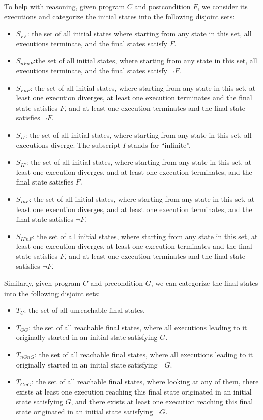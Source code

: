 To help with reasoning, given program $C$ and postcondition $F$, we consider its executions and categorize the initial states into the following disjoint sets: 
\begin{itemize}
	\item $S_{FF}$: the set of all initial states where starting from any state in this set, all executions terminate, and the final states satisfy $F$. 
	\item $S_{nFnF}$:the set of all initial states, where starting from any state in this set, all executions terminate, and the final states satisfy $\neg F$. 
	\item $S_{FnF}$: the set of all initial states, where starting from any state in this set, at least one execution diverges, at least one execution terminates and the final state satisfies $F$, and at least one execution terminates and the final state satisfies $\neg F$. 
	\item $S_{II}$: the set of all initial states, where starting from any state in this set, all executions diverge. The subscript $I$ stands for ``infinite''. 
	\item $S_{IF}$: the set of all initial states, where starting from any state in this set, at least one execution diverges, and at least one execution terminates, and the final state satisfies $F$. 
	\item $S_{InF}$: the set of all initial states, where starting from any state in this set, at least one execution diverges, and at least one execution terminates, and the final state satisfies $\neg F$. 
	\item $S_{IFnF}$: the set of all initial states, where starting from any state in this set, at least one execution diverges, at least one execution terminates and the final state satisfies $F$, and at least one execution terminates and the final state satisfies $\neg F$. 
\end{itemize}

Similarly, given program $C$ and precondition $G$, we can categorize the final states into the following disjoint sets: 
\begin{itemize}
	\item $T_{U}$: the set of all unreachable final states. 
	\item $T_{GG}$: the set of all reachable final states, where all executions leading to it originally started in an initial state satisfying $G$. 
	\item $T_{nGnG}$: the set of all reachable final states, where all executions leading to it originally started in an initial state satisfying $\neg G$. 
	\item $T_{GnG}$: the set of all reachable final states, where looking at any of them, there exists at least one execution reaching this final state originated in an initial state satisfying $G$, and there exists at least one execution reaching this final state originated in an initial state satisfying $\neg G$. 
\end{itemize}

